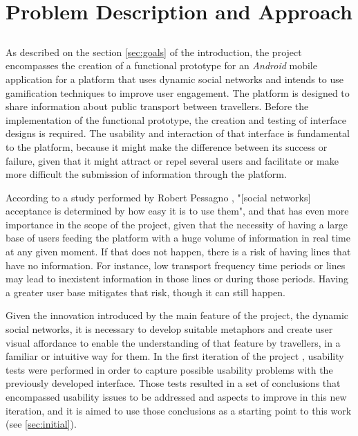 \chapter{Problem Description and Approach}\label{chap:chap3}

\section*{}

As described on the section \ref{sec:goals} of the introduction, the project encompasses the creation of a functional prototype for an \emph{Android} mobile application for a platform that uses dynamic social networks and intends to use gamification techniques to improve user engagement. The platform is designed to share information about public transport between travellers.
Before the implementation of the functional prototype, the creation and testing of interface designs is required. 
The usability and interaction of that interface is fundamental to the platform, because it might make the difference between its success or failure, given that it might attract or repel several users and facilitate or make more difficult the submission of information through the platform.

According to a study performed by Robert Pessagno \cite{kn:Pes10}, "[social networks] acceptance is determined by how easy it is to use them", and that has even more importance in the scope of the project, given that the necessity of having a large base of users feeding the platform with a huge volume of information in real time at any given moment. If that does not happen, there is a risk of having lines that have no information. For instance, low transport frequency time periods or lines may lead to inexistent information in those lines or during those periods. Having a greater user base mitigates that risk, though it can still happen.

Given the innovation introduced by the main feature of the project, the dynamic social networks, it is necessary to develop suitable metaphors and create user visual affordance to enable the understanding of that feature by travellers, in a familiar or intuitive way for them.
In the first iteration of the project \cite{kn:eSG12}, usability tests were performed in order to capture possible usability problems with the previously developed interface. 
Those tests resulted in a set of conclusions that encompassed  usability issues to be addressed and aspects to improve in this new iteration, and it is aimed to use those conclusions as a starting point to this work (see \ref{sec:initial}). 

